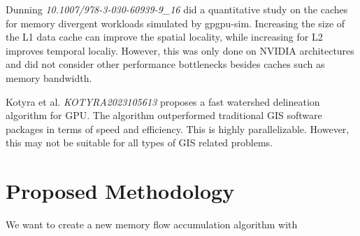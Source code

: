 \documentclass[journal, a4paper]{IEEEtran}
\begin{document}
	Dunning \textit{10.1007/978-3-030-60939-9_16} did a quantitative study on the caches for memory divergent workloads simulated by gpgpu-sim. Increasing the size of the L1 data cache can improve the spatial locality, while increasing for L2 improves temporal localiy. However, this was only done on NVIDIA architectures and did not consider other performance bottlenecks besides caches such as memory bandwidth.
	
	Kotyra et al. \textit{KOTYRA2023105613} proposes a fast watershed delineation algorithm for GPU. The algorithm outperformed traditional GIS software packages in terms of speed and efficiency. This is highly parallelizable. However, this may not be suitable for all types of GIS related problems.
	
	\section{Proposed Methodology}
	We want to create a new memory flow accumulation algorithm with 
	
	
\end{document}
